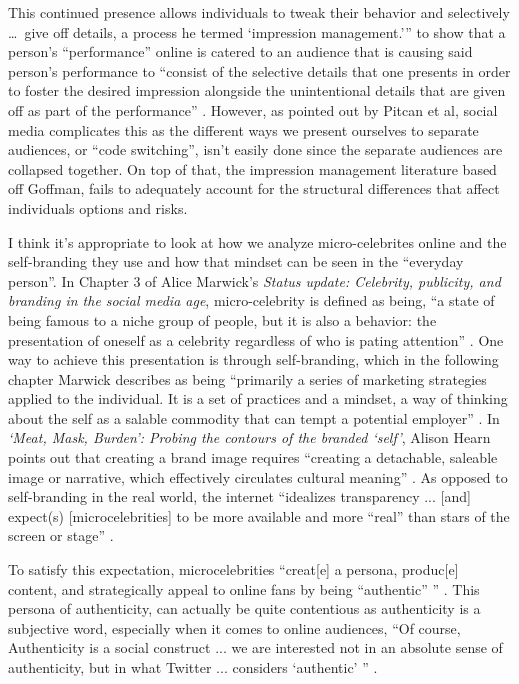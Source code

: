 \documentclass[12pt]{article}
\begin{document}
\begin{doublespace}
    This continued presence allows individuals to tweak their behavior and selectively \dots \ give off details, a process he termed `impression management.'''\autocite[378]{Hogan1}
    to show that a person's ``performance'' online is catered to an audience that is causing said person's performance to ``consist of the selective details that one presents in order to foster the desired impression alongside the unintentional details that are given off as part of the performance'' \autocite[378]{Hogan1}.
    However, as pointed out by Pitcan et al, social media complicates this as the different ways we present ourselves to separate audiences, or ``code switching'', isn't easily done since the separate audiences are collapsed together. On top of that, the impression management literature based off Goffman, fails to adequately account for the structural differences that affect individuals options and risks. \autocite*[164]{Pitcan1}
\par I think it's appropriate to look at how we analyze micro-celebrites online and the self-branding they use and how that mindset can be seen in the ``everyday person''.
    In Chapter 3 of Alice Marwick's \textit{Status update: Celebrity, publicity, and branding in the social media age}, micro-celebrity is defined as being, ``a state of being famous to a niche group of people, but it is also a behavior: the presentation of oneself as a celebrity regardless of who is pating attention'' \autocite*[114]{Marwick1}.
    One way to achieve this presentation is through self-branding, which in the following chapter Marwick describes as being ``primarily a series of marketing strategies applied to the individual. It is a set of practices and a mindset, a way of thinking about the self as a salable commodity that can tempt a potential employer'' \autocite*[166]{Marwick2}.
    In \textit{`Meat, Mask, Burden': Probing the contours of the branded `self'}, Alison Hearn points out that creating a brand image requires ``creating a detachable, saleable image or narrative, which effectively circulates cultural meaning'' \autocite*[198]{Hearn1}.
    As opposed to self-branding in the real world, the internet ``idealizes transparency ... [and] expect(s) [microcelebrities] to be more available and more ``real'' than stars of the screen or stage'' \autocite[114]{Marwick1}.
\par To satisfy this expectation, microcelebrities ``creat[e] a persona, produc[e] content, and strategically appeal to online fans by being ``authentic'' '' \autocite[114]{Marwick1}.
    This persona of authenticity, can actually be quite contentious as authenticity is a subjective word, especially when it comes to online audiences, ``Of course, Authenticity is a social construct ... we are interested not in an absolute sense of authenticity, but in what Twitter ... considers `authentic' '' \autocite[119]{MB1}.

\end{doublespace}
\end{document}
